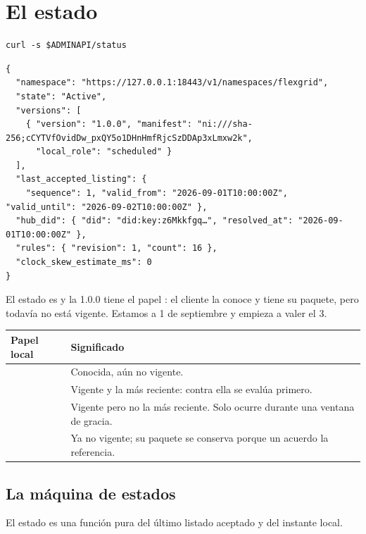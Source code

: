 \section{El estado}

\begin{lstlisting}[style=sh]
curl -s $ADMINAPI/status
\end{lstlisting}
\begin{lstlisting}[style=out]
{
  "namespace": "https://127.0.0.1:18443/v1/namespaces/flexgrid",
  "state": "Active",
  "versions": [
    { "version": "1.0.0", "manifest": "ni:///sha-256;cCYTVfOvidDw_pxQY5o1DHnHmfRjcSzDDAp3xLmxw2k",
      "local_role": "scheduled" }
  ],
  "last_accepted_listing": {
    "sequence": 1, "valid_from": "2026-09-01T10:00:00Z", "valid_until": "2026-09-02T10:00:00Z" },
  "hub_did": { "did": "did:key:z6Mkkfgq…", "resolved_at": "2026-09-01T10:00:00Z" },
  "rules": { "revision": 1, "count": 16 },
  "clock_skew_estimate_ms": 0
}
\end{lstlisting}

El estado es  y la 1.0.0 tiene el papel : el cliente la conoce y tiene su paquete,
pero todavía no está vigente. Estamos a 1 de septiembre y empieza a valer el 3.

\noindent\begin{tabularx}{\linewidth}{@{}L{2.4cm}Y@{}}
\toprule
\textbf{Papel local} & \textbf{Significado} \\
\midrule
{} & Conocida, aún no vigente. \\
 & Vigente y la más reciente: contra ella se evalúa primero. \\
 & Vigente pero no la más reciente. Solo ocurre durante una ventana de gracia. \\
 & Ya no vigente; su paquete se conserva porque un acuerdo la referencia. \\
\bottomrule
\end{tabularx}

\subsection{La máquina de estados}

El estado es una función pura del último listado aceptado y del instante local.

